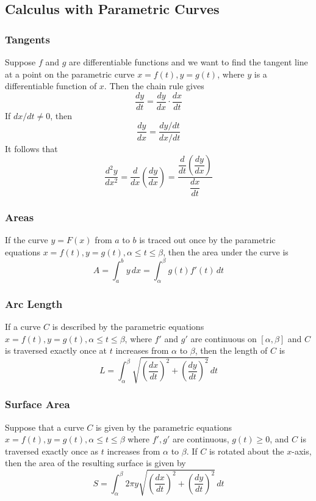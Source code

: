 \subsection{Calculus with Parametric Curves}

\subsubsection*{Tangents}
Suppose \(f\) and \(g\) are differentiable functions and we want to find the
tangent line at a point on the parametric curve \(x=f(t),y=g(t)\), where \(y\)
is a differentiable function of \(x\).
Then the chain rule gives
\[\frac{dy}{dt}=\frac{dy}{dx}\cdot\frac{dx}{dt}\]
If \(dx/dt\neq0\), then
\[\frac{dy}{dx}=\frac{dy/dt}{dx/dt}\]
It follows that
\[\frac{d^2y}{dx^2}=\frac{d}{dx}\left(\frac{dy}{dx}\right)
=\frac{\dfrac{d}{dt}\left(\dfrac{dy}{dx}\right)}{\dfrac{dx}{dt}}\]

\subsubsection*{Areas}
If the curve \(y=F(x)\) from \(a\) to \(b\) is traced out once by the
parametric equations \(x=f(t),y=g(t),\alpha\leq t\leq\beta\), then the area
under the curve is
\[A=\int_{a}^{b}y\,dx=\int_{\alpha}^{\beta}g(t)f'(t)\,dt\]

\subsubsection*{Arc Length}
\begin{theorem}
    If a curve \(C\) is described by the parametric equations
    \(x=f(t),y=g(t),\alpha\leq t\leq\beta\), where \(f'\) and \(g'\) are
    continuous on \([\alpha,\beta]\) and \(C\) is traversed exactly once at
    \(t\) increases from \(\alpha\) to \(\beta\), then the length of \(C\) is
    \[L=\int_{\alpha}^{\beta}
    \sqrt{\left(\frac{dx}{dt}\right)^2+\left(\frac{dy}{dt}\right)^2}\,dt\]
\end{theorem}

\subsubsection*{Surface Area}
Suppose that a curve \(C\) is given by the parametric equations
\(x=f(t),y=g(t),\alpha\leq t\leq\beta\) where \(f',g'\) are continuous,
\(g(t)\geq0\), and \(C\) is traversed exactly once as \(t\) increases from
\(\alpha\) to \(\beta\).
If \(C\) is rotated about the \(x\)-axis, then the area of the resulting
surface is given by
\[S=\int_{\alpha}^{\beta}2\pi y
\sqrt{\left(\frac{dx}{dt}\right)^2+\left(\frac{dy}{dt}\right)^2}\,dt\]